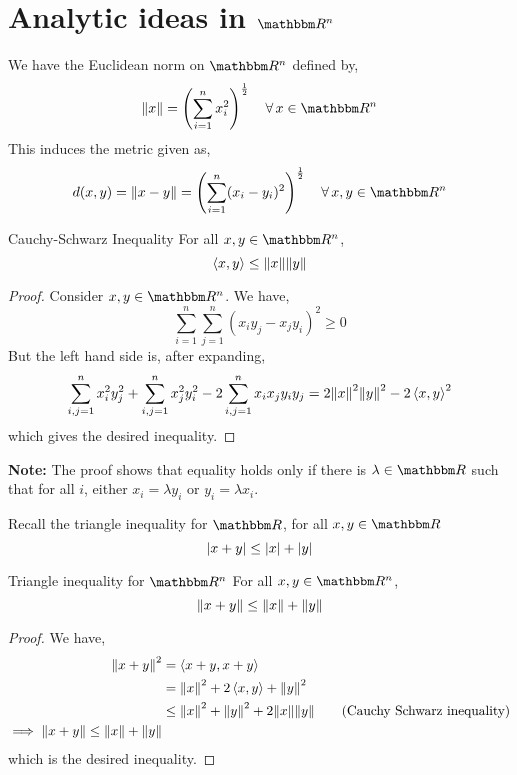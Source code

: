 \documentclass[Analysis-3]{subfiles}
\begin{document}
\section{Analytic ideas in $ \R^n $}

We have the Euclidean norm on $ \R^n $ defined by,
\[ \norm{x} = \left(\sum_{i=1}^{n}x_i^2\right)^{\frac 12} \quad \forall \, x \in \R^n \]
This induces the metric given as,
\[ d(x,y) = \norm{x-y} = \left(\sum_{i=1}^{n}(x_i-y_i)^2\right)^{\frac 12} \quad \forall \, x,y \in \R^n \]

\begin{Thm}{Cauchy-Schwarz Inequality}{}
      For all $ x,y \in \R^n $, \[ \left\langle {x}, {y} \right\rangle \leq \norm{x} \norm{y} \]
\end{Thm}
\begin{proof}
      Consider $ x,y \in \R^n $. We have,
      \[ \sum_{i=1}^{n}\sum_{j=1}^{n} (x_iy_j - x_jy_i)^2 \geq 0 \]
      But the left hand side is, after expanding,
      \[ \sum_{i,j = 1}^{n} x_i^2y_j^2 + \sum_{i,j = 1}^{n} x_j^2y_i^2 - 2 \sum_{i,j=1}^{n} x_ix_j y_iy_j = 2 \norm{x}^2\norm{y}^2 - 2\left\langle {x}, {y} \right\rangle^2 \]
      which gives the desired inequality.
\end{proof}

\textbf{Note:} The proof shows that equality holds only if there is $ \lambda \in \R $ such that for all $ i $, either $ x_i = \lambda y_i $ or $ y_i = \lambda x_i $.
\msk

Recall the triangle inequality for $ \R $, for all $ x,y \in \R $
\[ \abs{x+y} \leq \abs{x} + \abs{y} \]

\begin{Thm}{Triangle inequality for $ \R^n $}{}
      For all $ x,y \in \R^n $,
      \[ \norm{x+y} \leq \norm{x} + \norm{y} \]
\end{Thm}
\begin{proof}
      We have,
      \begin{align*}
            \norm{x+y}^2 & = \left\langle {x+y}, {x+y} \right\rangle                                                                 \\
                         & = \norm{x}^2 + 2\left\langle {x}, {y} \right\rangle + \norm{y}^2                                             \\
                         & \leq \norm{x}^2 + \norm{y}^2 +2 \norm{x}\norm{y} \tag{Cauchy Schwarz inequality} \\
            \implies \norm{x+y} \leq \norm{x} + \norm{y}
      \end{align*}
      which is the desired inequality.
\end{proof}
\msk
\end{document}
